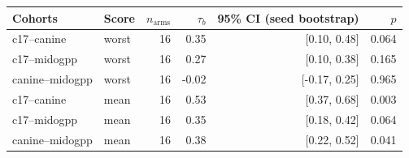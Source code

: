 \begin{tabular}{llrrrr}
\toprule
Cohorts & Score & $n_\text{arms}$ & $\tau_b$ & 95\% CI (seed bootstrap) & $p$ \\
\midrule
c17--canine & worst & 16 & 0.35 & [0.10, 0.48] & 0.064 \\
c17--midogpp & worst & 16 & 0.27 & [0.10, 0.38] & 0.165 \\
canine--midogpp & worst & 16 & -0.02 & [-0.17, 0.25] & 0.965 \\
c17--canine & mean & 16 & 0.53 & [0.37, 0.68] & 0.003 \\
c17--midogpp & mean & 16 & 0.35 & [0.18, 0.42] & 0.064 \\
canine--midogpp & mean & 16 & 0.38 & [0.22, 0.52] & 0.041 \\
\bottomrule
\end{tabular}
